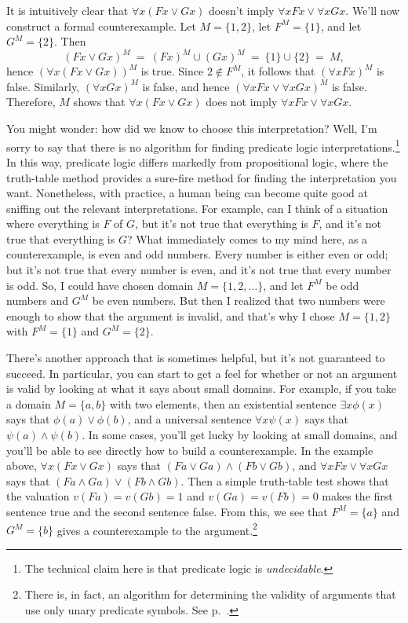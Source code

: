 \begin{example} It is intuitively clear that $\forall x(Fx\vee Gx)$
  doesn't imply $\forall xFx\vee \forall xGx$.  We'll now construct a
  formal counterexample.  Let $M=\{ 1,2\}$, let $F^M=\{ 1\}$, and let
  $G^M=\{ 2\}$.  Then
  \[ (Fx\vee Gx)^M \:=\: (Fx)^M\cup (Gx)^M \: =\: \{1\}\cup \{ 2\}
    \:=\: M , \] hence $(\forall x(Fx\vee Gx))^M$ is true.  Since
  $2\not\in F^M$, it follows that $(\forall xFx)^M$ is false.
  Similarly, $(\forall xGx)^M$ is false, and hence
  $(\forall xFx\vee \forall xGx)^M$ is false.  Therefore, $M$ shows
  that $\forall x(Fx\vee Gx)$ does not imply
  $\forall xFx\vee\forall xGx$. \end{example}

You might wonder: how did we know to choose this interpretation?
Well, I'm sorry to say that there is no algorithm for finding
predicate logic interpretations.\footnote{The technical claim here is
  that predicate logic is \emph{undecidable}.}  In this way, predicate
logic differs markedly from propositional logic, where the truth-table
method provides a sure-fire method for finding the interpretation you
want.  Nonetheless, with practice, a human being can become quite good
at sniffing out the relevant interpretations.  For example, can I
think of a situation where everything is $F$ of $G$, but it's not true
that everything is $F$, and it's not true that everything is $G$?
What immediately comes to my mind here, as a counterexample, is even
and odd numbers.  Every number is either even or odd; but it's not
true that every number is even, and it's not true that every number is
odd.  So, I could have chosen domain $M=\{ 1,2,\dots \}$, and let
$F^M$ be odd numbers and $G^M$ be even numbers.  But then I realized
that two numbers were enough to show that the argument is invalid, and
that's why I chose $M=\{ 1,2\}$ with $F^M=\{ 1\}$ and $G^M=\{ 2\}$.

There's another approach that is sometimes helpful, but it's not
guaranteed to succeed.  In particular, you can start to get a feel for
whether or not an argument is valid by looking at what it says about
small domains.  For example, if you take a domain $M=\{ a,b\}$ with
two elements, then an existential sentence $\exists x\phi (x)$ says
that \mbox{$\phi (a)\vee \phi (b)$}, and a universal sentence
$\forall x\psi (x)$ says that $\psi (a)\wedge\psi (b)$.  In some
cases, you'll get lucky by looking at small domains, and you'll be
able to see directly how to build a counterexample.  In the example
above, $\forall x(Fx\vee Gx)$ says that
$(Fa\vee Ga)\wedge (Fb\vee Gb)$, and $\forall xFx\vee\forall xGx$ says
that $(Fa\wedge Ga)\vee (Fb\wedge Gb)$.  Then a simple truth-table
test shows that the valuation $v(Fa)=v(Gb)=1$ and $v(Ga)=v(Fb)=0$
makes the first sentence true and the second sentence false.  From
this, we see that $F^M=\{ a\}$ and $G^M=\{ b\}$ gives a counterexample
to the argument.\footnote{There is, in fact, an algorithm for
  determining the validity of arguments that use only unary predicate
  symbols. See p.\ \pageref{algorithms}.}
                              

